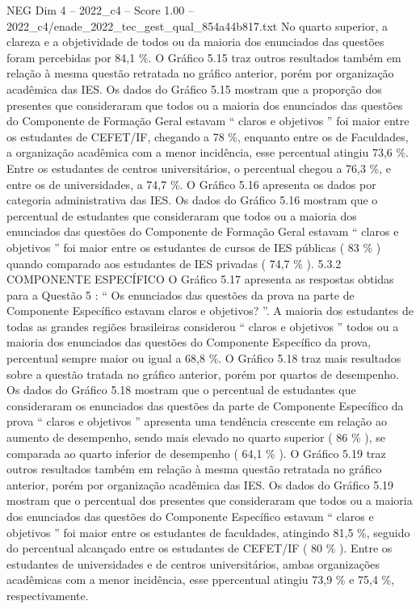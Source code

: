 \begin{textsample}{NEG Dim 4 – 2022\_c4 – Score 1.00 – 2022\_c4/enade\_2022\_tec\_gest\_qual\_854a44b817.txt}
No quarto superior, a clareza e a objetividade de todos ou da maioria dos enunciados das questões foram percebidas por 84,1 \%.
O Gráfico 5.15 traz outros resultados também em relação à mesma questão retratada no gráfico anterior, porém por organização acadêmica das IES.
Os dados do Gráfico 5.15 mostram que a proporção dos presentes que consideraram que todos ou a maioria dos enunciados das questões do Componente de Formação Geral estavam “ claros e objetivos ” foi maior entre os estudantes de CEFET/IF, chegando a 78 \%, enquanto entre os de Faculdades, a organização acadêmica com a menor incidência, esse percentual atingiu 73,6 \%.
Entre os estudantes de centros universitários, o percentual chegou a 76,3 \%, e entre os de universidades, a 74,7 \%.
O Gráfico 5.16 apresenta os dados por categoria administrativa das IES.
Os dados do Gráfico 5.16 mostram que o percentual de estudantes que consideraram que todos ou a maioria dos enunciados das questões do Componente de Formação Geral estavam “ claros e objetivos ” foi maior entre os estudantes de cursos de IES públicas ( 83 \% ) quando comparado aos estudantes de IES privadas ( 74,7 \% ). 5.3.2 COMPONENTE ESPECÍFICO O Gráfico 5.17 apresenta as respostas obtidas para a Questão 5 : “ Os enunciados das questões da prova na parte de Componente Específico estavam claros e objetivos? ”.
A maioria dos estudantes de todas as grandes regiões brasileiras considerou “ claros e objetivos ” todos ou a maioria dos enunciados das questões do Componente Específico da prova, percentual sempre maior ou igual a 68,8 \%.
O Gráfico 5.18 traz mais resultados sobre a questão tratada no gráfico anterior, porém por quartos de desempenho.
Os dados do Gráfico 5.18 mostram que o percentual de estudantes que consideraram os enunciados das questões da parte de Componente Específico da prova “ claros e objetivos ” apresenta uma tendência crescente em relação ao aumento de desempenho, sendo mais elevado no quarto superior ( 86 \% ), se comparada ao quarto inferior de desempenho ( 64,1 \% ).
O Gráfico 5.19 traz outros resultados também em relação à mesma questão retratada no gráfico anterior, porém por organização acadêmica das IES.
Os dados do Gráfico 5.19 mostram que o percentual dos presentes que consideraram que todos ou a maioria dos enunciados das questões do Componente Específico estavam “ claros e objetivos ” foi maior entre os estudantes de faculdades, atingindo 81,5 \%, seguido do percentual alcançado entre os estudantes de CEFET/IF ( 80 \% ).
Entre os estudantes de universidades e de centros universitários, ambas organizações acadêmicas com a menor incidência, esse ppercentual atingiu 73,9 \% e 75,4 \%, respectivamente.

\end{textsample}
